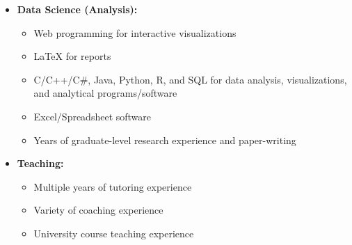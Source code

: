 \documentclass[letterpaper,11pt]{article}
\begin{document}
\begin{itemize}
  \item \textbf{Data Science (Analysis):}
  \begin{itemize}
  \item Web programming for interactive visualizations
  \item LaTeX for reports
  \item C/C++/C\#, Java, Python, R, and SQL for data analysis, visualizations, and analytical programs/software
  \item Excel/Spreadsheet software
  \item Years of graduate-level research experience and paper-writing
  \end{itemize}
  \item \textbf{Teaching:}
  \begin{itemize}
  \item Multiple years of tutoring experience
  \item Variety of coaching experience
  \item University course teaching experience
  \end{itemize}
\end{itemize}
\end{document}
